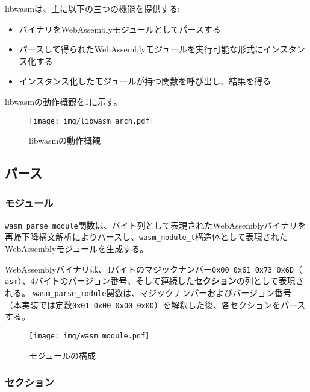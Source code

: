 libwasmは、主に以下の三つの機能を提供する:

\begin{itemize}
  \item バイナリをWebAssemblyモジュールとしてパースする
  \item パースして得られたWebAssemblyモジュールを実行可能な形式にインスタンス化する
  \item インスタンス化したモジュールが持つ関数を呼び出し、結果を得る
\end{itemize}

libwasmの動作概観を\ref{fig:libwasm_arch}に示す。

\begin{figure}[htbp]
  \caption{libwasmの動作概観}
  \label{fig:libwasm_arch}
  \begin{center}
    \texttt{[image: img/libwasm\_arch.pdf]}
  \end{center}
\end{figure}

\subsection{パース}

\subsubsection{モジュール}

\verb|wasm_parse_module|関数は、バイト列として表現されたWebAssemblyバイナリを再帰下降構文解析によりパースし、\verb|wasm_module_t|構造体として表現されたWebAssemblyモジュールを生成する。

WebAssemblyバイナリは、4バイトのマジックナンバー{\tt 0x00 0x61 0x73 0x6D}（\verb*| asm|）、4バイトのバージョン番号、そして連続した{\bf セクション}の列として表現される。
\verb|wasm_parse_module|関数は、マジックナンバーおよびバージョン番号（本実装では定数{\tt 0x01 0x00 0x00 0x00}）を解釈した後、各セクションをパースする。

\begin{figure}[htbp]
  \caption{モジュールの構成}
  \label{fig:wasm_module}
  \begin{center}
    \texttt{[image: img/wasm\_module.pdf]}
  \end{center}
\end{figure}

\subsubsection{セクション}

